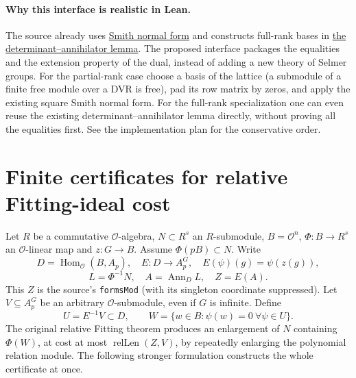 \documentclass[11pt]{article}
\newcommand{\Ocal}{\mathcal O}
\newcommand{\rl}{\operatorname{relLen}}
\newcommand{\Hom}{\operatorname{Hom}}
\newcommand{\ann}{\operatorname{Ann}}
\newcommand{\src}[3]{\href{https://github.com/VladimirReshetnikov/ProveIt/blob/835c3695d07c0f77060c5cc63f92eeb52a7d21c2/Analysis/GeneralizedRiemannHypothesis/Lean/grh/src/#1.lean\#L#2}{#3}}
\newcommand{\fitlib}[2]{\src{Lib/General/Algebra/FittingIdealsAndLengths}{#1}{#2}}
\begin{document}
\paragraph{Why this interface is realistic in Lean.}
The source already uses \fitlib{251}{Smith normal form} and constructs full-rank bases in \fitlib{303}{the determinant--annihilator lemma}. The proposed interface packages the equalities and the extension property of the dual, instead of adding a new theory of Selmer groups. For the partial-rank case choose a basis of the lattice (a submodule of a finite free module over a DVR is free), pad its row matrix by zeros, and apply the existing square Smith normal form. For the full-rank specialization one can even reuse the existing determinant--annihilator lemma directly, without proving all the equalities first. See the implementation plan for the conservative order.

\section{Finite certificates for relative Fitting-ideal cost}\label{sec:relative}
Let $R$ be a commutative $\Ocal$-algebra, $N\subset R^s$ an $R$-submodule, $B=\Ocal^n$, $\Phi:B\to R^s$ an $\Ocal$-linear map and $z:G\to B$. Assume $\Phi(pB)\subset N$. Write
\[
 D=\Hom_{\Ocal}(B,A_p),\quad E:D\longrightarrow A_p^G,
 \quad E(\psi)(g)=\psi(z(g)),
\]
\[
 L=\Phi^{-1}N,\quad A=\ann_D L,\quad Z=E(A).
\]
This $Z$ is the source's \texttt{formsMod} (with its singleton coordinate suppressed). Let $V\subseteq A_p^G$ be an arbitrary $\Ocal$-submodule, even if $G$ is infinite. Define
\[
 U=E^{-1}V\subset D,\qquad W=\{w\in B:\psi(w)=0\ \forall\psi\in U\}.
\]
The original relative Fitting theorem produces an enlargement of $N$ containing $\Phi(W)$, at cost at most $\rl(Z,V)$, by repeatedly enlarging the polynomial relation module. The following stronger formulation constructs the whole certificate at once.
\end{document}
